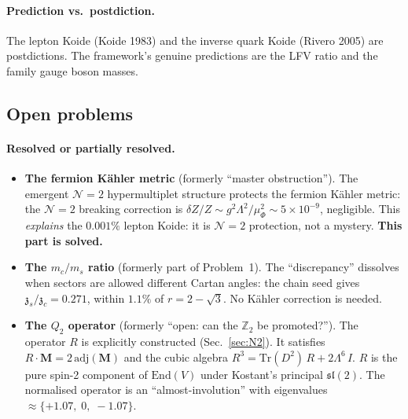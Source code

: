 \documentclass[12pt,a4paper]{article}
\newcommand{\Tr}{\mathrm{Tr}}
\newcommand{\adj}{\mathrm{adj}}
\newcommand{\zch}{\mathfrak{z}}
\begin{document}
\paragraph{Prediction vs.\ postdiction.}
The lepton Koide (Koide 1983) and the inverse quark Koide
(Rivero 2005) are postdictions.
The framework's genuine predictions are the LFV ratio and the
family gauge boson masses.


\subsection{Open problems}
\label{sec:open_problems}

\paragraph{Resolved or partially resolved.}
\begin{itemize}
\item \textbf{The fermion K\"ahler metric} (formerly ``master
  obstruction'').
  The emergent $\mathcal{N}{=}2$ hypermultiplet structure
  protects the fermion K\"ahler metric: the $\mathcal{N}{=}2$
  breaking correction is $\delta Z/Z \sim g^2\Lambda^2/\mu_\Phi^2
  \sim 5 \times 10^{-9}$, negligible.
  This \emph{explains} the $0.001\%$ lepton Koide: it is
  $\mathcal{N}{=}2$ protection, not a mystery.
  \textbf{This part is solved.}

\item \textbf{The $m_c/m_s$ ratio} (formerly part of Problem~1).
  The ``discrepancy'' dissolves when sectors are allowed
  different Cartan angles: the chain seed gives
  $\zch_s/\zch_c = 0.271$, within $1.1\%$ of $r = 2 - \sqrt{3}$.
  No K\"ahler correction is needed.

\item \textbf{The $Q_2$ operator} (formerly ``open: can the
  $\mathbb{Z}_2$ be promoted?'').
  The operator $R$ is explicitly constructed
  (Sec.~\ref{sec:N2}).
  It satisfies $R \cdot \mathbf{M} = 2\,\adj(\mathbf{M})$
  and the cubic algebra
  $R^3 = \Tr(D^2)\,R + 2\Lambda^6\,I$.
  $R$ is the pure spin-2 component of $\mathrm{End}(V)$ under
  Kostant's principal $\mathfrak{sl}(2)$.
  The normalised operator is an ``almost-involution'' with
  eigenvalues $\approx \{+1.07,\; 0,\; -1.07\}$.
\end{itemize}
\end{document}
